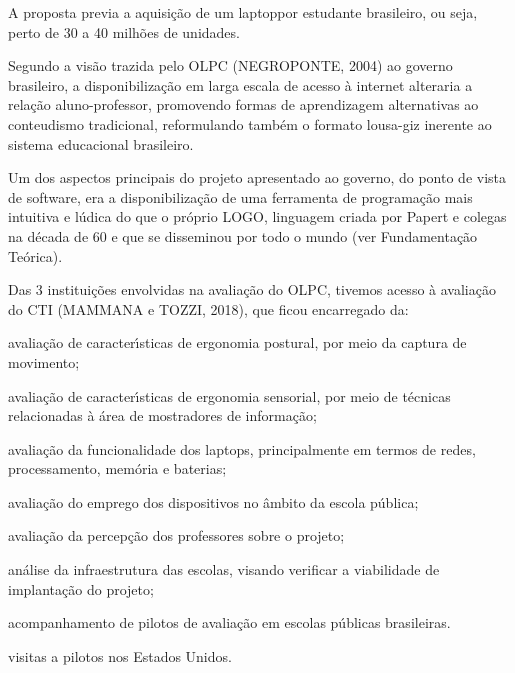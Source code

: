 \documentclass[
12pt,		%
openright,	%
twoside,  %
a4paper,			%
chapter=TITLE,		%
english,			%
french,				%
spanish,			%
brazil				%
]{USPSC-classe/USPSC}
\begin{document}
A proposta previa a aquisi\c{c}\~ao de um \textquotedbl laptop\textquotedbl  por estudante brasileiro, ou seja, perto de 30 a 40 milh\~oes de unidades.








Segundo a vis\~ao trazida pelo OLPC  (NEGROPONTE, 2004) ao governo brasileiro, a disponibiliza\c{c}\~ao em larga escala de acesso \`a internet alteraria a rela\c{c}\~ao aluno-professor, promovendo formas de aprendizagem alternativas ao conteudismo tradicional, reformulando tamb\'em o formato lousa-giz inerente ao sistema educacional brasileiro.








Um dos aspectos principais do projeto apresentado ao governo, do ponto de vista de software, era a disponibiliza\c{c}\~ao de uma ferramenta de programa\c{c}\~ao mais intuitiva e l\'udica do que o pr\'oprio LOGO, linguagem criada por Papert e colegas na d\'ecada de 60 e que se disseminou por todo o mundo (ver Fundamenta\c{c}\~ao Te\'orica).








Das 3 institui\c{c}\~oes envolvidas na avalia\c{c}\~ao do OLPC, tivemos acesso \`a avalia\c{c}\~ao do CTI  (MAMMANA e TOZZI, 2018), que ficou encarregado da:









\begin{alineas}
\item avalia\c{c}\~ao de caracter\'{\i}sticas de ergonomia postural, por meio da captura de movimento;
\item avalia\c{c}\~ao de caracter\'{\i}sticas de ergonomia sensorial, por meio de t\'ecnicas relacionadas \`a \'area de mostradores de informa\c{c}\~ao;
\item avalia\c{c}\~ao da funcionalidade dos \textquotedbl laptops\textquotedbl , principalmente em termos de redes, processamento, mem\'oria e baterias;
\item avalia\c{c}\~ao do emprego dos dispositivos no \^ambito da escola p\'ublica;
\item avalia\c{c}\~ao da percep\c{c}\~ao dos professores sobre o projeto;
\item an\'alise da infraestrutura das escolas, visando verificar a viabilidade de implanta\c{c}\~ao do projeto;
\item acompanhamento de pilotos de avalia\c{c}\~ao em escolas p\'ublicas brasileiras.
\item visitas a pilotos nos Estados Unidos.
\end{alineas}
\end{document}
